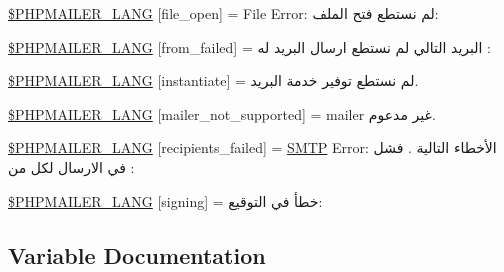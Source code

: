 \begin{DoxyCompactItemize}
\item 
\hyperlink{phpmailer_8lang-ar_8php_a28d1a6517bf4c942a0ddd506188ad2e0}{\$\+P\+H\+P\+M\+A\+I\+L\+E\+R\+\_\+\+L\+A\+NG} \mbox{[}\textquotesingle{}file\+\_\+open\textquotesingle{}\mbox{]} = \textquotesingle{}File Error\+: لم نستطع فتح الملف\+: \textquotesingle{}
\item 
\hyperlink{phpmailer_8lang-ar_8php_adf832ae12155a09be077c6d5e4fd7e22}{\$\+P\+H\+P\+M\+A\+I\+L\+E\+R\+\_\+\+L\+A\+NG} \mbox{[}\textquotesingle{}from\+\_\+failed\textquotesingle{}\mbox{]} = \textquotesingle{}البريد التالي لم نستطع ارسال البريد له \+: \textquotesingle{}
\item 
\hyperlink{phpmailer_8lang-ar_8php_ad58dde16780f4770ccf4dd282ea1f5ad}{\$\+P\+H\+P\+M\+A\+I\+L\+E\+R\+\_\+\+L\+A\+NG} \mbox{[}\textquotesingle{}instantiate\textquotesingle{}\mbox{]} = \textquotesingle{}لم نستطع توفير خدمة البريد.\textquotesingle{}
\item 
\hyperlink{phpmailer_8lang-ar_8php_aa2ebcb8833ee83a7ad67401c4bb3a6ad}{\$\+P\+H\+P\+M\+A\+I\+L\+E\+R\+\_\+\+L\+A\+NG} \mbox{[}\textquotesingle{}mailer\+\_\+not\+\_\+supported\textquotesingle{}\mbox{]} = \textquotesingle{} mailer غير مدعوم.\textquotesingle{}
\item 
\hyperlink{phpmailer_8lang-ar_8php_a7589d30bb9b368327c2df015f3e6bcba}{\$\+P\+H\+P\+M\+A\+I\+L\+E\+R\+\_\+\+L\+A\+NG} \mbox{[}\textquotesingle{}recipients\+\_\+failed\textquotesingle{}\mbox{]} = \textquotesingle{}\hyperlink{class_s_m_t_p}{S\+M\+TP} Error\+: الأخطاء التالية \textquotesingle{} . \textquotesingle{}فشل في الارسال لكل من \+: \textquotesingle{}
\item 
\hyperlink{phpmailer_8lang-ar_8php_a68e437bdb9b968a5a67320f03d231565}{\$\+P\+H\+P\+M\+A\+I\+L\+E\+R\+\_\+\+L\+A\+NG} \mbox{[}\textquotesingle{}signing\textquotesingle{}\mbox{]} = \textquotesingle{}خطأ في التوقيع\+: \textquotesingle{}
\end{DoxyCompactItemize}


\subsection{Variable Documentation}
